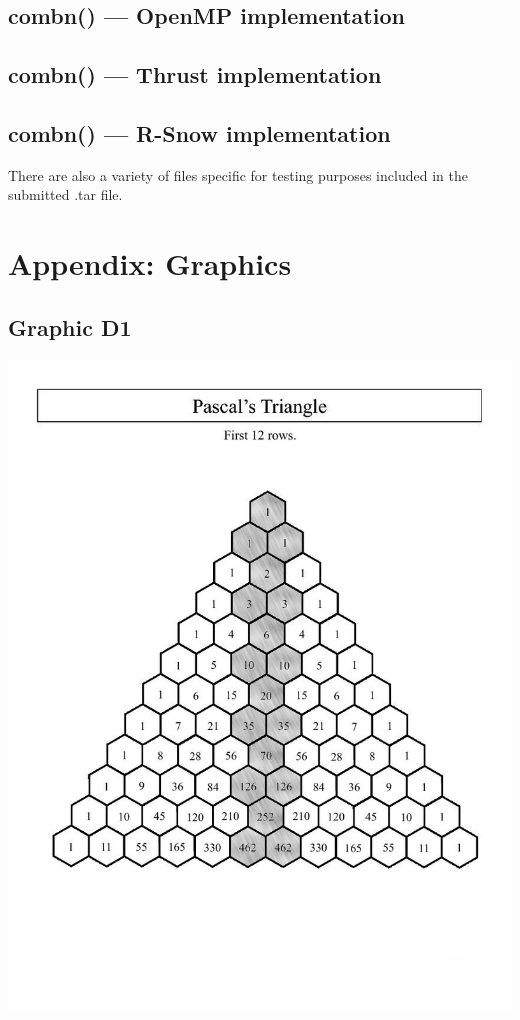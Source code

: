 \documentclass[titlepage, 11pt]{article}
\begin{document}
\subsection{combn() --- OpenMP implementation}


\subsection{combn() --- Thrust implementation}


\subsection{combn() --- R-Snow implementation}



There are also a variety of files specific for testing purposes included in the submitted .tar file.

\section{Appendix: Graphics}
\subsection{Graphic D1}
\begin{center}
\includegraphics[scale = 0.4]{images/pascals-triangle-vert.jpg} \\
\end{center}
\end{document}
